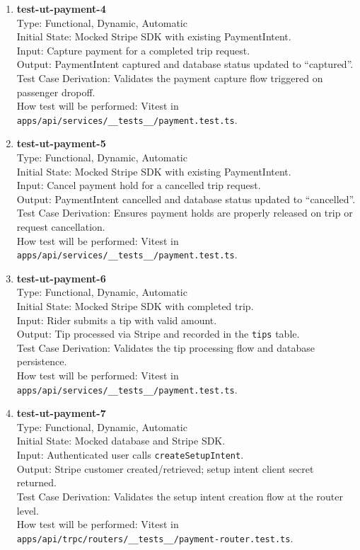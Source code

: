 \documentclass[12pt, titlepage]{article}
\begin{document}
\begin{enumerate}
\item \textbf{test-ut-payment-4}\\
Type: Functional, Dynamic, Automatic\\
Initial State: Mocked Stripe SDK with existing PaymentIntent.\\
Input: Capture payment for a completed trip request.\\
Output: PaymentIntent captured and database status updated to ``captured''.\\
Test Case Derivation: Validates the payment capture flow triggered on passenger dropoff.\\
How test will be performed: Vitest in \texttt{apps/api/services/\_\_tests\_\_/payment.test.ts}.\\

\item \textbf{test-ut-payment-5}\\
Type: Functional, Dynamic, Automatic\\
Initial State: Mocked Stripe SDK with existing PaymentIntent.\\
Input: Cancel payment hold for a cancelled trip request.\\
Output: PaymentIntent cancelled and database status updated to ``cancelled''.\\
Test Case Derivation: Ensures payment holds are properly released on trip or request cancellation.\\
How test will be performed: Vitest in \texttt{apps/api/services/\_\_tests\_\_/payment.test.ts}.\\

\item \textbf{test-ut-payment-6}\\
Type: Functional, Dynamic, Automatic\\
Initial State: Mocked Stripe SDK with completed trip.\\
Input: Rider submits a tip with valid amount.\\
Output: Tip processed via Stripe and recorded in the \texttt{tips} table.\\
Test Case Derivation: Validates the tip processing flow and database persistence.\\
How test will be performed: Vitest in \texttt{apps/api/services/\_\_tests\_\_/payment.test.ts}.\\

\item \textbf{test-ut-payment-7}\\
Type: Functional, Dynamic, Automatic\\
Initial State: Mocked database and Stripe SDK.\\
Input: Authenticated user calls \texttt{createSetupIntent}.\\
Output: Stripe customer created/retrieved; setup intent client secret returned.\\
Test Case Derivation: Validates the setup intent creation flow at the router level.\\
How test will be performed: Vitest in \texttt{apps/api/trpc/routers/\_\_tests\_\_/payment-router.test.ts}.\\


\end{enumerate}
\end{document}
